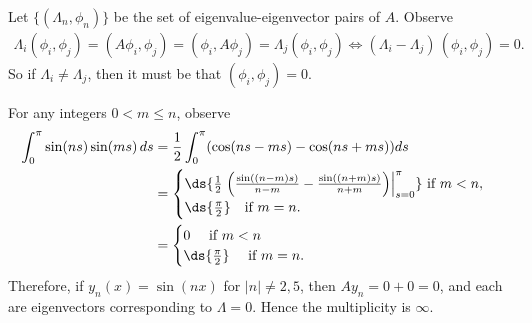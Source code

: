 \documentclass{homework}
\begin{document}

\enlargethispage{1.5em}
\begin{solution}
  Let $\{(\Lambda_n,\phi_n)\}$ be the set of eigenvalue-eigenvector pairs of $A$.  Observe
  \begin{align*}
	 \Lambda_i(\phi_i,\phi_j) = (A\phi_i,\phi_j) = (\phi_i,A\phi_j) = \Lambda_j(\phi_i,\phi_j) \iff (\Lambda_i - \Lambda_j)\,(\phi_i,\phi_j) = 0.
  \end{align*}
  So if $\Lambda_i \not= \Lambda_j$, then it must be that $(\phi_i,\phi_j) = 0$.
\end{solution}
\newpage



\begin{solution}
  For any integers $0<m\le n$, observe
  \begin{align*}
    \int_0^{\pi} \sin(ns) \sin(ms)\,ds
    &= \frac 12 \int_0^\pi(\cos(ns - ms) - \cos(ns + ms))ds\\
  \renewcommand{\arraystretch}{1.5}
    &= \begin{cases}
      \ds{\frac 12 \left.\left(\frac {\sin((n-m)s)}{n-m} - \frac {\sin((n+m)s)}{n+m}\right) \right|_{s=0}^{\pi}} \text{ if } m<n,\\
      \ds{\frac \pi2} \quad\text{if } m=n.
    \end{cases}\\
    &= \begin{cases}
      0  \quad\text{ if } m<n\\
      \ds{\frac \pi2} \quad\text{ if } m=n.
    \end{cases}
  \end{align*}
  Therefore, if $y_n(x) = \sin(nx)$ for $|n|\not=2,5$, then $Ay_n = 0 + 0 = 0$, and each are eigenvectors corresponding to $\Lambda =0$. Hence the multiplicity is $\infty$.
\end{solution}

\end{document}
